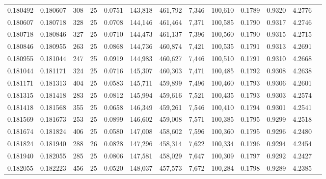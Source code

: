 \begin{tabular}{rrrrrrrrrrrrr}
0.180492 & 0.180607 &   308 &  25 &                                     0.0751 & 143,818 & 461,792 &   7,346 & 100,610 & 0.1789 & 0.9320 & 4.2776 \\
0.180607 & 0.180718 &   328 &  25 &                                     0.0708 & 144,146 & 461,464 &   7,371 & 100,585 & 0.1790 & 0.9317 & 4.2746 \\
0.180718 & 0.180846 &   327 &  25 &                                     0.0710 & 144,473 & 461,137 &   7,396 & 100,560 & 0.1790 & 0.9315 & 4.2715 \\
0.180846 & 0.180955 &   263 &  25 &                                     0.0868 & 144,736 & 460,874 &   7,421 & 100,535 & 0.1791 & 0.9313 & 4.2691 \\
0.180955 & 0.181044 &   247 &  25 &                                     0.0919 & 144,983 & 460,627 &   7,446 & 100,510 & 0.1791 & 0.9310 & 4.2668 \\
0.181044 & 0.181171 &   324 &  25 &                                     0.0716 & 145,307 & 460,303 &   7,471 & 100,485 & 0.1792 & 0.9308 & 4.2638 \\
0.181171 & 0.181313 &   404 &  25 &                                     0.0583 & 145,711 & 459,899 &   7,496 & 100,460 & 0.1793 & 0.9306 & 4.2601 \\
0.181315 & 0.181418 &   283 &  25 &                                     0.0812 & 145,994 & 459,616 &   7,521 & 100,435 & 0.1793 & 0.9303 & 4.2574 \\
0.181418 & 0.181568 &   355 &  25 &                                     0.0658 & 146,349 & 459,261 &   7,546 & 100,410 & 0.1794 & 0.9301 & 4.2541 \\
0.181569 & 0.181673 &   253 &  25 &                                     0.0899 & 146,602 & 459,008 &   7,571 & 100,385 & 0.1795 & 0.9299 & 4.2518 \\
0.181674 & 0.181824 &   406 &  25 &                                     0.0580 & 147,008 & 458,602 &   7,596 & 100,360 & 0.1795 & 0.9296 & 4.2480 \\
0.181824 & 0.181940 &   288 &  26 &                                     0.0828 & 147,296 & 458,314 &   7,622 & 100,334 & 0.1796 & 0.9294 & 4.2454 \\
0.181940 & 0.182055 &   285 &  25 &                                     0.0806 & 147,581 & 458,029 &   7,647 & 100,309 & 0.1797 & 0.9292 & 4.2427 \\
0.182055 & 0.182223 &   456 &  25 &                                     0.0520 & 148,037 & 457,573 &   7,672 & 100,284 & 0.1798 & 0.9289 & 4.2385 \\

\end{tabular}
